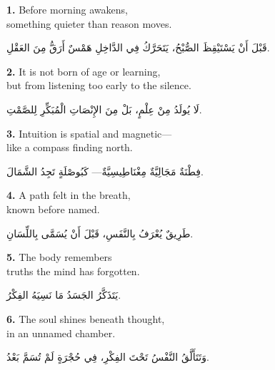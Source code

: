 \documentclass[11pt,a4paper,twoside]{book}
\begin{document}
{\color{indigo}\bfseries 1.}\quad
Before morning awakens,\\
something quieter than reason moves.

\begin{flushright}
{\arabicfont
قَبْلَ أَنْ يَسْتَيْقِظَ الصُّبْحُ،
يَتَحَرَّكُ فِي الدَّاخِلِ هَمْسٌ أَرَقُّ مِنَ العَقْلِ.}
\end{flushright}

\vspace{1em}
{\color{indigo}\bfseries 2.}\quad
It is not born of age or learning,\\
but from listening too early to the silence.

\begin{flushright}
{\arabicfont
لَا يُولَدُ مِنْ عِلْمٍ،
بَلْ مِنَ الإِنْصَاتِ الْمُبَكِّرِ لِلصَّمْتِ.}
\end{flushright}

\vspace{1em}
{\color{indigo}\bfseries 3.}\quad
Intuition is spatial and magnetic—\\
like a compass finding north.

\begin{flushright}
{\arabicfont
فِطْنَةٌ مَجَالِيَّةٌ مِغْنَاطِيسِيَّةٌ—
كَبُوصْلَةٍ تَجِدُ الشَّمَالَ.}
\end{flushright}

\vspace{1em}
{\color{indigo}\bfseries 4.}\quad
A path felt in the breath,\\
known before named.

\begin{flushright}
{\arabicfont
طَرِيقٌ يُعْرَفُ بِالنَّفَسِ،
قَبْلَ أَنْ يُسَمَّى بِاللِّسَانِ.}
\end{flushright}

\vspace{1em}
{\color{indigo}\bfseries 5.}\quad
The body remembers\\
truths the mind has forgotten.

\begin{flushright}
{\arabicfont
يَتَذَكَّرُ الجَسَدُ
مَا نَسِيَهُ الفِكْرُ.}
\end{flushright}

\vspace{1em}
{\color{indigo}\bfseries 6.}\quad
The soul shines beneath thought,\\
in an unnamed chamber.

\begin{flushright}
{\arabicfont
وَتَتَأَلَّقُ النَّفْسُ تَحْتَ الفِكْرِ،
فِي حُجْرَةٍ لَمْ تُسَمَّ بَعْدُ.}
\end{flushright}
\end{document}
